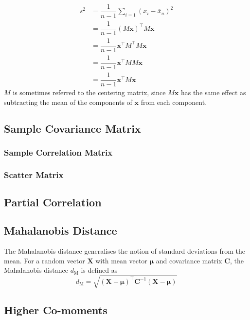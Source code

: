 \documentclass[11pt]{report} %
\begin{document}
\begin{align}
s^{2} &= \dfrac{1}{n - 1}\sum_{i = 1}\left(x_{i} - \overline{x}_{n}\right)^{2} \\
&= \dfrac{1}{n - 1}\left(M\mathbf{x}\right)^{\top}M\mathbf{x} \\
&= \dfrac{1}{n - 1}\mathbf{x}^{\top}M^{\top}M\mathbf{x} \\
&= \dfrac{1}{n - 1}\mathbf{x}^{\top}MM\mathbf{x} \\
&= \dfrac{1}{n - 1}\mathbf{x}^{\top}M\mathbf{x}
\end{align}
$M$ is sometimes referred to the centering matrix, since $M\mathbf{x}$ has the same effect as subtracting the mean of the components of $\mathbf{x}$ from each component.

\subsection{Sample Covariance Matrix}

\subsubsection{Sample Correlation Matrix}

\subsubsection{Scatter Matrix}

\subsection{Partial Correlation}

\subsection{Mahalanobis Distance}

The Mahalanobis distance generalises the notion of standard deviations from the mean. For a random vector $\mathbf{X}$ with mean vector $\boldsymbol{\mu}$ and covariance matrix $\mathbf{C}$, the Mahalanobis distance $d_{\mathrm{M}}$ is defined as
\begin{equation}
d_{\mathrm{M}} = \sqrt{\left(\mathbf{X} - \boldsymbol{\mu}\right)^{\top}\mathbf{C}^{-1}\left(\mathbf{X} - \boldsymbol{\mu}\right)}
\end{equation}

\subsection{Higher Co-moments \cite{Miller2013}}
\end{document}
